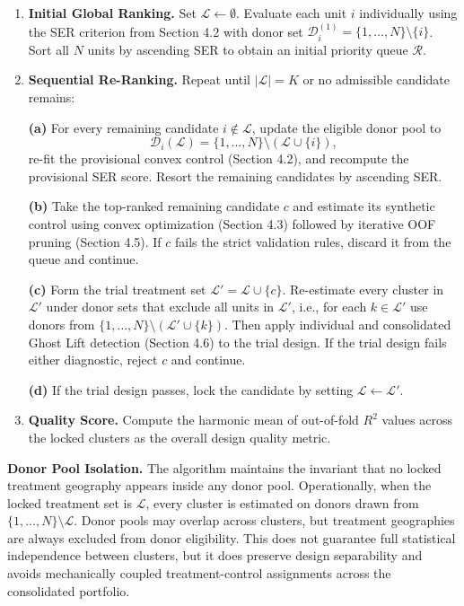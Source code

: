 \documentclass[11pt]{article}
\begin{document}
\begin{enumerate}
\item \textbf{Initial Global Ranking.} Set $\mathcal{L} \leftarrow \emptyset$. Evaluate each unit $i$ individually using the SER criterion from Section 4.2 with donor set $\mathcal{D}_i^{(1)} = \{1, \ldots, N\} \setminus \{i\}$. Sort all $N$ units by ascending SER to obtain an initial priority queue $\mathcal{R}$.

\item \textbf{Sequential Re-Ranking.} Repeat until $|\mathcal{L}| = K$ or no admissible candidate remains:

\textbf{(a)} For every remaining candidate $i \notin \mathcal{L}$, update the eligible donor pool to
\[
\mathcal{D}_i(\mathcal{L}) = \{1, \ldots, N\} \setminus (\mathcal{L} \cup \{i\}),
\]
re-fit the provisional convex control (Section 4.2), and recompute the provisional SER score. Resort the remaining candidates by ascending SER.

\textbf{(b)} Take the top-ranked remaining candidate $c$ and estimate its synthetic control using convex optimization (Section 4.3) followed by iterative OOF pruning (Section 4.5). If $c$ fails the strict validation rules, discard it from the queue and continue.

\textbf{(c)} Form the trial treatment set $\mathcal{L}' = \mathcal{L} \cup \{c\}$. Re-estimate every cluster in $\mathcal{L}'$ under donor sets that exclude all units in $\mathcal{L}'$, i.e., for each $k \in \mathcal{L}'$ use donors from $\{1, \ldots, N\} \setminus (\mathcal{L}' \cup \{k\})$. Then apply individual and consolidated Ghost Lift detection (Section 4.6) to the trial design. If the trial design fails either diagnostic, reject $c$ and continue.

\textbf{(d)} If the trial design passes, lock the candidate by setting $\mathcal{L} \leftarrow \mathcal{L}'$.

\item \textbf{Quality Score.} Compute the harmonic mean of out-of-fold $R^2$ values across the locked clusters as the overall design quality metric.
\end{enumerate}

\textbf{Donor Pool Isolation.} The algorithm maintains the invariant that no locked treatment geography appears inside any donor pool. Operationally, when the locked treatment set is $\mathcal{L}$, every cluster is estimated on donors drawn from $\{1, \ldots, N\} \setminus \mathcal{L}$. Donor pools may overlap across clusters, but treatment geographies are always excluded from donor eligibility. This does not guarantee full statistical independence between clusters, but it does preserve design separability and avoids mechanically coupled treatment-control assignments across the consolidated portfolio.
\end{document}
